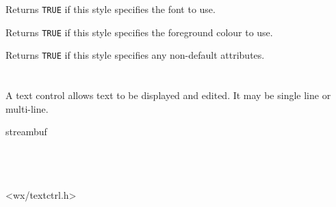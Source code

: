 

Returns {\tt TRUE} if this style specifies the font to use.



Returns {\tt TRUE} if this style specifies the foreground colour to use.



Returns {\tt TRUE} if this style specifies any non-default attributes.


\section{}\label{wxtextctrl}

A text control allows text to be displayed and edited. It may be
single line or multi-line.


streambuf\\
\\
\\
\\


<wx/textctrl.h>


